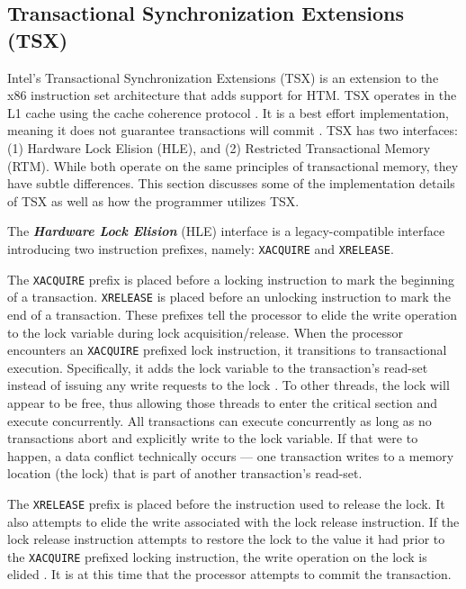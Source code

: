 \documentclass{sig-alternate}
\begin{document}
\subsection{Transactional Synchronization Extensions (TSX)}

Intel's Transactional Synchronization Extensions (TSX) is an extension to the x86
instruction set architecture that adds support for HTM.  TSX operates in the L1 cache
using the cache coherence protocol \cite{intel_opt_man}.  It is a best effort
implementation, meaning it does not guarantee transactions will commit
\cite{intel_prog_ref}.  TSX has two interfaces: (1) Hardware Lock Elision (HLE), and (2)
Restricted Transactional Memory (RTM).  While both operate on the same principles of
transactional memory, they have subtle differences.  This section discusses some of the
implementation details of TSX as well as how the programmer utilizes TSX.

The \emph{\textbf{Hardware Lock Elision}} (HLE) interface is a legacy-compatible interface
introducing two instruction prefixes, namely: \texttt{XACQUIRE} and \texttt{XRELEASE}.

The \texttt{XACQUIRE} prefix is placed before a locking instruction to mark the beginning
of a transaction.  \texttt{XRELEASE} is placed before an unlocking instruction to mark the
end of a transaction.  These prefixes tell the processor to elide the write operation to
the lock variable during lock acquisition/release.  When the processor encounters an
\texttt{XACQUIRE} prefixed lock instruction, it transitions to transactional execution.
Specifically, it adds the lock variable to the transaction's read-set instead of issuing
any write requests to the lock \cite{intel_prog_ref}.  To other threads, the lock will
appear to be free, thus allowing those threads to enter the critical section and execute
concurrently.  All transactions can execute concurrently as long as no transactions abort
and explicitly write to the lock variable.  If that were to happen, a data conflict
technically occurs --- one transaction writes to a memory location (the lock) that is part
of another transaction's read-set.

The \texttt{XRELEASE} prefix is placed before the instruction used to release the lock.
It also attempts to elide the write associated with the lock release instruction.  If the
lock release instruction attempts to restore the lock to the value it had prior to the
\texttt{XACQUIRE} prefixed locking instruction, the write operation on the lock is elided
\cite{intel_prog_ref}.  It is at this time that the processor attempts to commit the
transaction.
\end{document}
